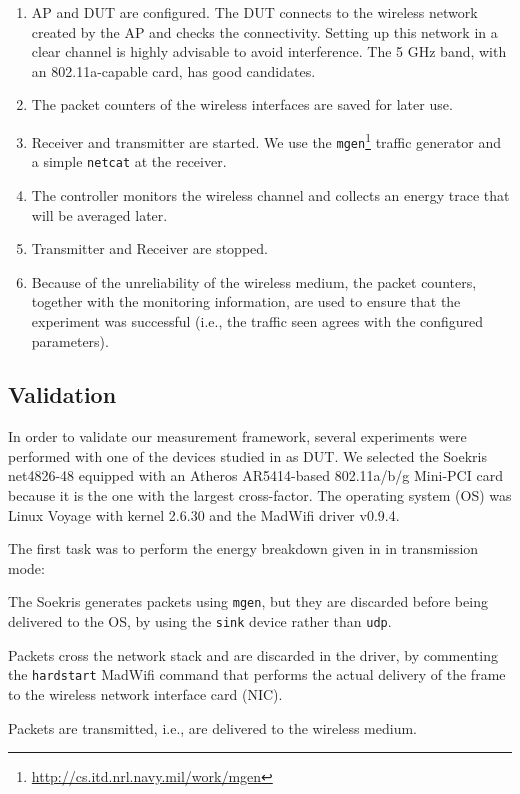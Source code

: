 \documentclass[twoside,nohyper]{tufte-book}
\providecommand{\tightlist}{%
  \setlength{\itemsep}{0pt}\setlength{\parskip}{0pt}}
\theoremstyle{definition}
\theoremstyle{definition}
\theoremstyle{definition}
\theoremstyle{remark}
\begin{document}
\begin{enumerate}
\def\labelenumi{\arabic{enumi}.}
\tightlist
\item
  AP and DUT are configured. The DUT connects to the wireless network
  created by the AP and checks the connectivity. Setting up this network
  in a clear channel is highly advisable to avoid interference. The 5
  GHz band, with an 802.11a-capable card, has good candidates.
\item
  The packet counters of the wireless interfaces are saved for later
  use.
\item
  Receiver and transmitter are started. We use the
  \texttt{mgen}\footnote{\url{http://cs.itd.nrl.navy.mil/work/mgen}}
  traffic generator and a simple \texttt{netcat} at the receiver.
\item
  The controller monitors the wireless channel and collects an energy
  trace that will be averaged later.
\item
  Transmitter and Receiver are stopped.
\item
  Because of the unreliability of the wireless medium, the packet
  counters, together with the monitoring information, are used to ensure
  that the experiment was successful (i.e., the traffic seen agrees with
  the configured parameters).
\end{enumerate}

\subsection{Validation}\label{validation}

In order to validate our measurement framework, several experiments were
performed with one of the devices studied in \citet{Serrano2014} as DUT.
We selected the Soekris net4826-48 equipped with an Atheros AR5414-based
802.11a/b/g Mini-PCI card because it is the one with the largest
cross-factor. The operating system (OS) was Linux Voyage with kernel
2.6.30 and the MadWifi driver v0.9.4.

The first task was to perform the energy breakdown given in
\citet{Serrano2014} in transmission mode:

\begin{description}
\tightlist
\item[User space]
The Soekris generates packets using \texttt{mgen}, but they are
discarded before being delivered to the OS, by using the \texttt{sink}
device rather than \texttt{udp}.
\item[Kernel space]
Packets cross the network stack and are discarded in the driver, by
commenting the \texttt{hardstart} MadWifi command that performs the
actual delivery of the frame to the wireless network interface card
(NIC).
\item[Wireless NIC]
Packets are transmitted, i.e., are delivered to the wireless medium.
\end{description}
\end{document}
